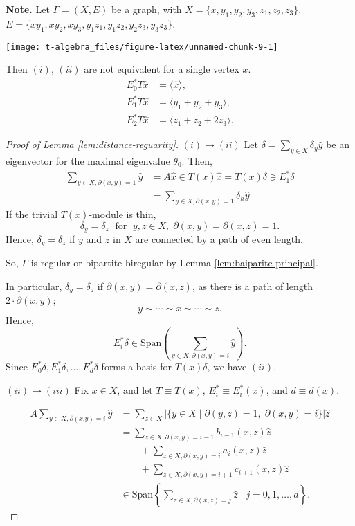 \documentclass[
]{book}
\theoremstyle{definition}
\theoremstyle{definition}
\theoremstyle{definition}
\theoremstyle{definition}
\theoremstyle{remark}
\begin{document}
\textbf{Note.}
Let \(\Gamma = (X, E)\) be a graph, with \(X = \{x, y_1, y_2, y_3, z_1, z_2, z_3\}\), \(E = \{xy_1, xy_2, xy_3, y_1z_1, y_1z_2, y_2z_3, y_3z_3\}\).

\begin{center}\texttt{[image: t-algebra\_files/figure-latex/unnamed-chunk-9-1]} \end{center}

Then \((i)\), \((ii)\) are not equivalent for a single vertex \(x\).
\begin{align}
E^*_0T\hat{x} & = \langle \hat{x}\rangle, \\
E^*_1T\hat{x} & = \langle y_1 + y_2 + y_3\rangle, \\
E^*_2T\hat{x} & = \langle z_1 + z_2 + 2z_3\rangle.
\end{align}

\begin{proof}[Proof of Lemma \ref{lem:distance-reguarity}]
\((i)\to (ii)\)
Let \(\delta = \sum_{y\in X}\delta_y\hat{y}\) be an eigenvector for the maximal eigenvalue \(\theta_0\). Then,
\begin{align}
\sum_{y\in X, \partial(x,y) = 1}\hat{y} & = A\hat{x} \in T(x)\hat{x} = T(x)\delta \ni E^*_1\delta\\
& = \sum_{y\in X, \partial(x,y)=1}\delta_h\hat{y}
\end{align}
If the trivial \(T(x)\)-module is thin,
\[\delta_y = \delta_z \; \text{ for }\; y, z\in X, \; \partial(x,y) = \partial(x,z) = 1.\]
Hence, \(\delta_y = \delta_z\) if \(y\) and \(z\) in \(X\) are connected by a path of even length.

So, \(\Gamma\) is regular or bipartite biregular by Lemma \ref{lem:baiparite-principal}.

In particular, \(\delta_y = \delta_z\) if \(\partial(x,y) = \partial(x,z)\), as there is a path of length \(2\cdot \partial(x,y)\);
\[y\sim \cdots \sim x \sim \cdots \sim z.\]
Hence,
\[E^*_i\delta \in \mathrm{Span}\left(\sum_{y\in X, \partial(x,y) = i}\hat{y}\right).\]
Since \(E^*_0\delta, E^*_1\delta, \ldots, E^*_d\delta\) forms a basis for \(T(x)\delta\), we have \((ii)\).

\((ii)\to (iii)\)
Fix \(x\in X\), and let \(T \equiv T(x)\), \(E^*_i\equiv E^*_i(x)\), and \(d \equiv d(x)\).

\begin{align}
A\sum_{y\in X, \partial(x.y)=i}\hat{y} & = \sum_{z\in X} |\{y\in X \mid \partial(y,z) = 1, \; \partial(x,y) = i\}|\hat{z}\\
& = \sum_{z\in X, \partial(x,y) = i-1}b_{i-1}(x,z)\hat{z} \\
& \qquad + \sum_{z\in X, \partial(x,y) = i} a_{i}(x,z)\hat{z} \\
& \qquad + \sum_{z\in X, \partial(x,y) = i+1} c_{i+1}(x,z)\hat{z}\\
& \in \mathrm{Span}\left\{\left.\sum_{z\in X, \partial(x,z) = j}\hat{z} \; \right| \; j = 0, 1, \ldots, d \right\}.
\end{align}


\end{proof}
\end{document}

